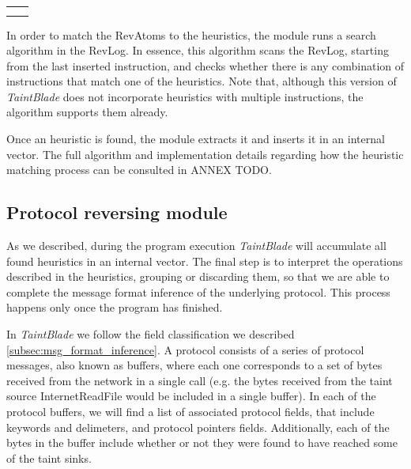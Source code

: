 \documentclass[conference]{IEEEtran}
\begin{document}
\begin{table}[htbp]
\begin{center}
\begin{tabular}{|>{\centering\arraybackslash}p{1.5cm}|>{\centering\arraybackslash}p{6.3cm}|}
                               &                                                                       \\
                               &                                                                       \\
            \hline
        \end{tabular}
        \label{tab1}
    \end{center}
    \label{table:implemented_heuristics}
\end{table}

In order to match the RevAtoms to the heuristics, the module runs a search
algorithm in the RevLog. In essence, this algorithm scans the RevLog, starting
from the last inserted instruction, and checks whether there is any combination
of instructions that match one of the heuristics. Note that, although this
version of \textit{TaintBlade} does not incorporate heuristics with multiple
instructions, the algorithm supports them already.

Once an heuristic is found, the module extracts it and inserts it in an
internal vector. The full algorithm and implementation details regarding how
the heuristic matching process can be consulted in ANNEX TODO.

\subsection{Protocol reversing module}
As we described, during the program execution \textit{TaintBlade} will
accumulate all found heuristics in an internal vector. The final step is to
interpret the operations described in the heuristics, grouping or discarding
them, so that we are able to complete the message format inference of the
underlying protocol. This process happens only once the program has finished.

In \textit{TaintBlade} we follow the field classification we described \ref{subsec:msg_format_inference}.
A protocol consists of a series of protocol messages, also known as buffers,
where each one corresponds to a set of bytes received from the network in a
single call (e.g. the bytes received from the taint source InternetReadFile
would be included in a single buffer). In each of the protocol buffers, we will
find a list of associated protocol fields, that include keywords and delimeters,
and protocol pointers fields. Additionally, each of the bytes in the buffer
include whether or not they were found to have reached some of the taint sinks.
\end{document}
